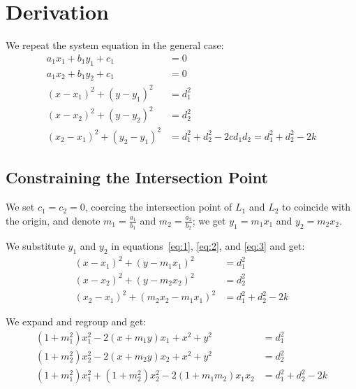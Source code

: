 \section{Derivation}
\label{sec:derivation}
We repeat the system equation in the general case:
\begin{align}
  a_1 x_1 + b_1 y_1 + c_1 &= 0\\
  a_1 x_2 + b_1 y_2 + c_1 &= 0\\
  (x - x_1)^2 + (y - y_1)^2 &= d_1^2\label{eq:1}\\
  (x - x_2)^2 + (y - y_2)^2 &= d_2^2\label{eq:2}\\
  (x_2 - x_1)^2 + (y_2 - y_1)^2 &= d_1^2 + d_2^2 - 2 c d_1 d_2 = d_1^2 + d_2^2 - 2 k\label{eq:3}
\end{align}

\subsection{Constraining the Intersection Point}
\label{ssec:derivation-constraining-origin}
\setlength{\parskip}{1ex}
We set $c_1 = c_2 = 0$, coercing the intersection point of $L_1$ and $L_2$ to coincide with the origin, and denote $m_1 = \frac{a_1}{b_1}$ and $m_2 = \frac{a_2}{b_2}$; we get $y_1 = m_1 x_1$ and $y_2 = m_2 x_2$.

\noindent
We substitute $y_1$ and $y_2$ in equations~\ref{eq:1}, \ref{eq:2}, and \ref{eq:3} and get:
\begin{align}
  (x - x_1)^2 + (y - m_1 x_1)^2 & = d_1^2\\
  (x - x_2)^2 + (y - m_2 x_2)^2 & = d_2^2\\
  (x_2 - x_1)^2 + (m_2 x_2 - m_1 x_1)^2 & = d_1^2 + d_2^2 - 2 k
\end{align}

\noindent
We expand and regroup and get:
\begin{align}
  (1 + m_1^2) x_1^2 - 2 (x + m_1 y) x_1  + x^2 + y^2  &= d_1^2\label{eq:d1}\\
  (1 + m_2^2) x_2^2 - 2 (x + m_2 y) x_2  + x^2 + y^2  &= d_2^2\label{eq:d2}\\
  (1 + m_1^2) x_1^2 + (1 + m_2^2) x_2^2 - 2 (1 + m_1 m_2) x_1 x_2 &= d_1^2 + d_2^2 - 2 k\label{eq:d}
\end{align}


